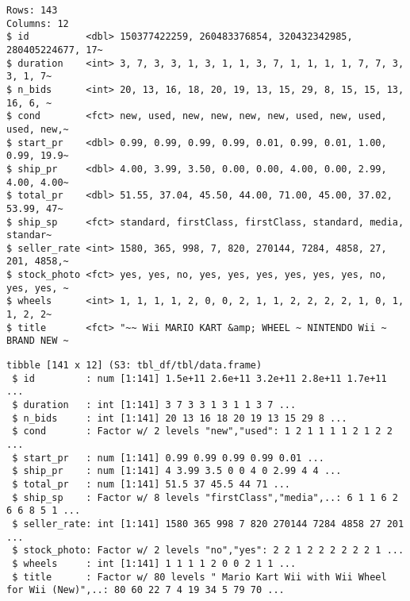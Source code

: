 \documentclass[
]{book}
\newenvironment{Shaded}{\begin{snugshade}}{\end{snugshade}}
\newcommand{\CommentTok}[1]{\textcolor[rgb]{0.56,0.35,0.01}{\textit{#1}}}
\newcommand{\DecValTok}[1]{\textcolor[rgb]{0.00,0.00,0.81}{#1}}
\newcommand{\KeywordTok}[1]{\textcolor[rgb]{0.13,0.29,0.53}{\textbf{#1}}}
\newcommand{\NormalTok}[1]{#1}
\newcommand{\OperatorTok}[1]{\textcolor[rgb]{0.81,0.36,0.00}{\textbf{#1}}}
\newcommand{\StringTok}[1]{\textcolor[rgb]{0.31,0.60,0.02}{#1}}
\begin{document}
\begin{verbatim}
Rows: 143
Columns: 12
$ id          <dbl> 150377422259, 260483376854, 320432342985, 280405224677, 17~
$ duration    <int> 3, 7, 3, 3, 1, 3, 1, 1, 3, 7, 1, 1, 1, 1, 7, 7, 3, 3, 1, 7~
$ n_bids      <int> 20, 13, 16, 18, 20, 19, 13, 15, 29, 8, 15, 15, 13, 16, 6, ~
$ cond        <fct> new, used, new, new, new, new, used, new, used, used, new,~
$ start_pr    <dbl> 0.99, 0.99, 0.99, 0.99, 0.01, 0.99, 0.01, 1.00, 0.99, 19.9~
$ ship_pr     <dbl> 4.00, 3.99, 3.50, 0.00, 0.00, 4.00, 0.00, 2.99, 4.00, 4.00~
$ total_pr    <dbl> 51.55, 37.04, 45.50, 44.00, 71.00, 45.00, 37.02, 53.99, 47~
$ ship_sp     <fct> standard, firstClass, firstClass, standard, media, standar~
$ seller_rate <int> 1580, 365, 998, 7, 820, 270144, 7284, 4858, 27, 201, 4858,~
$ stock_photo <fct> yes, yes, no, yes, yes, yes, yes, yes, yes, no, yes, yes, ~
$ wheels      <int> 1, 1, 1, 1, 2, 0, 0, 2, 1, 1, 2, 2, 2, 2, 1, 0, 1, 1, 2, 2~
$ title       <fct> "~~ Wii MARIO KART &amp; WHEEL ~ NINTENDO Wii ~ BRAND NEW ~
\end{verbatim}

\begin{Shaded}
\end{Shaded}

\begin{verbatim}
tibble [141 x 12] (S3: tbl_df/tbl/data.frame)
 $ id         : num [1:141] 1.5e+11 2.6e+11 3.2e+11 2.8e+11 1.7e+11 ...
 $ duration   : int [1:141] 3 7 3 3 1 3 1 1 3 7 ...
 $ n_bids     : int [1:141] 20 13 16 18 20 19 13 15 29 8 ...
 $ cond       : Factor w/ 2 levels "new","used": 1 2 1 1 1 1 2 1 2 2 ...
 $ start_pr   : num [1:141] 0.99 0.99 0.99 0.99 0.01 ...
 $ ship_pr    : num [1:141] 4 3.99 3.5 0 0 4 0 2.99 4 4 ...
 $ total_pr   : num [1:141] 51.5 37 45.5 44 71 ...
 $ ship_sp    : Factor w/ 8 levels "firstClass","media",..: 6 1 1 6 2 6 6 8 5 1 ...
 $ seller_rate: int [1:141] 1580 365 998 7 820 270144 7284 4858 27 201 ...
 $ stock_photo: Factor w/ 2 levels "no","yes": 2 2 1 2 2 2 2 2 2 1 ...
 $ wheels     : int [1:141] 1 1 1 1 2 0 0 2 1 1 ...
 $ title      : Factor w/ 80 levels " Mario Kart Wii with Wii Wheel for Wii (New)",..: 80 60 22 7 4 19 34 5 79 70 ...
\end{verbatim}
\end{document}
